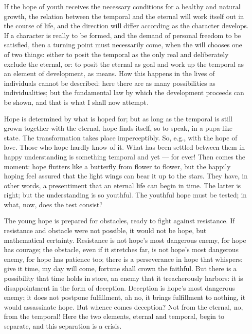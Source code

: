 \documentclass[12pt,a4paper,openany]{book}
\newcommand{\opage}[1]{\marginnote{\footnotesize\textit{[#1]}}}
\begin{document}
If the hope of youth receives the necessary conditions
for a healthy and natural growth, the relation between the
temporal and the eternal will work itself out in the course
of life, and the direction will differ according as the character
develops. If a character is really to be formed,
and the demand of personal freedom to be satisfied,
then a turning point must necessarily come,
when the will chooses one of two things: either to posit
the temporal as the only real and deliberately
exclude the eternal, or: to posit the eternal as goal
and work up the temporal as an element of development, as
means. How this happens in the lives of individuals cannot
be described: here there are as many possibilities as
individualities; but the fundamental law by which the development
\setcounter{footnote}{0}%
\opage{23}proceeds can be shown, and that is what I shall now
attempt.

Hope is determined by what is hoped for; but as
long as the temporal is still grown together with the
eternal, hope finds itself, so to speak, in a pupa-like
state. The transformation takes place imperceptibly. So,
e.g., with the hope of love. Those who hope hardly know
of it. What has been settled between them in happy understanding
is something temporal and yet --- for ever! Then
comes the moment: hope flutters like a butterfly
from flower to flower, but the happily hoping feel
assured that the light wings can bear it
up to the stars. They have, in other words, a presentiment
that an eternal life can begin in time. The latter
is right; but the understanding is so youthful. The
youthful hope must be tested; in what, now, does
the test consist?

The young hope is prepared for obstacles, ready
to fight against resistance. If resistance and
obstacle were not possible, it would not be hope,
but mathematical certainty. Resistance is not hope's
most dangerous enemy, for hope has courage; the obstacle, even
if it stretches far, is not hope's most dangerous
enemy, for hope has patience too; there is a perseverance
in hope that whispers: give it time, my day
will come, fortune shall crown the faithful. But there
is a possibility that time holds in store, an enemy
that it treacherously harbors: it is disappointment in the form of deception.
Deception is hope's most dangerous enemy; it does not postpone
fulfillment, ah no, it brings fulfillment
to nothing, it would assassinate hope. But whence
comes deception? Not from the eternal, no, from the
\setcounter{footnote}{0}%
\opage{24}temporal! Here the two elements, eternal and
temporal, begin to separate, and this separation is a crisis.
\end{document}
